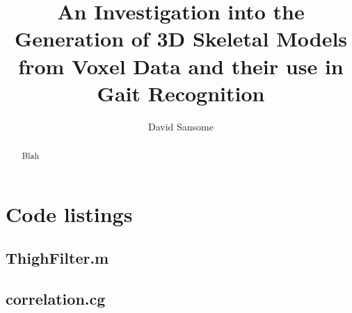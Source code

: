 \documentclass[a4paper,10pt]{article}
\title{An Investigation into the Generation of 3D Skeletal Models from Voxel Data and their use in Gait Recognition}
\author{David Sansome}
\begin{document}


\maketitle

\bigskip
\begin{abstract}
	Blah
\end{abstract}

\newpage

\tableofcontents





\newpage


\appendix

\section{Code listings}

\subsection{ThighFilter.m}
\lstset{language=Matlab}


\subsection{correlation.cg}
\lstset{language=Cg}

\end{document}
